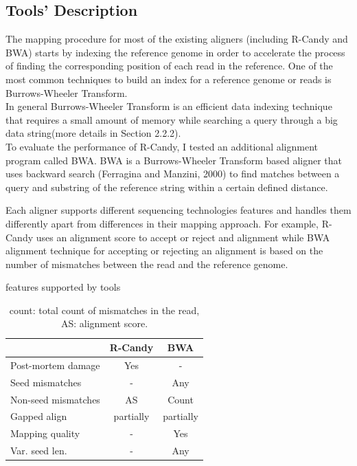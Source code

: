 \documentclass[11pt,a4paper]{report}
\begin{document}
\subsection{Tools' Description}

The mapping procedure for most of the existing aligners (including R-Candy and BWA) starts by indexing the reference genome in order to accelerate the process of finding the corresponding position of each read in the reference.
One of the most common techniques to build an index for a reference genome or reads is Burrows-Wheeler Transform.
\\
In general Burrows-Wheeler Transform is an efficient data indexing technique that requires a small amount of memory while searching a query through a big data string(more details in Section 2.2.2).\\

To evaluate the performance of R-Candy, I tested an additional
alignment program called BWA.
BWA is a Burrows-Wheeler Transform based aligner that uses backward search (Ferragina and Manzini, 2000) 
to find matches  between a query and substring of the reference string within a certain defined distance\cite{bwa}.

Each aligner supports different sequencing technologies features and handles them differently apart from differences in their mapping approach.
For example, R-Candy uses an alignment score to accept or reject and alignment while BWA alignment technique for accepting or rejecting an alignment is based on the number of mismatches between the read and the reference genome\cite{bwa}.


\begin{table}[H]
 \centering
 \caption{features supported by tools}
  \begin{tabular}{ |  p{4cm} | c | c |}
   \hline 
  				  	   & \textbf{R-Candy} &\textbf{ BWA}  \\ \hline
  	   Post-mortem damage & Yes & - \\	  	   
       Seed mismatches &  -  & Any  \\
   Non-seed mismatches & AS  & Count  \\ 
          Gapped align & partially & partially \\ 
       Mapping quality & - & Yes  \\
       Var. seed len.  & -   &  Any \\
       \hline
      \end{tabular}
	\caption*{count: total count of mismatches in the read, AS: alignment score. 
	 }
 	\label{features}
\end{table}
\end{document}
